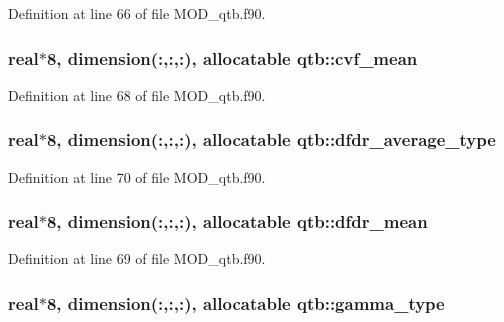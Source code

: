 Definition at line 66 of file M\-O\-D\-\_\-qtb.\-f90.

\hypertarget{classqtb_a46ac722f370f3b929e706228051801f4}{
\subsubsection[{cvf\-\_\-mean}]{\setlength{\rightskip}{0pt plus 5cm}real$\ast$8, dimension(\-:,\-:,\-:), allocatable qtb\-::cvf\-\_\-mean}}\label{classqtb_a46ac722f370f3b929e706228051801f4}


Definition at line 68 of file M\-O\-D\-\_\-qtb.\-f90.

\hypertarget{classqtb_a56c736b040cf072d7ec1e444bf685fb1}{
\subsubsection[{dfdr\-\_\-average\-\_\-type}]{\setlength{\rightskip}{0pt plus 5cm}real$\ast$8, dimension(\-:,\-:,\-:), allocatable qtb\-::dfdr\-\_\-average\-\_\-type}}\label{classqtb_a56c736b040cf072d7ec1e444bf685fb1}


Definition at line 70 of file M\-O\-D\-\_\-qtb.\-f90.

\hypertarget{classqtb_a4f973bc50caab8bd82ffbe4acb07dca9}{
\subsubsection[{dfdr\-\_\-mean}]{\setlength{\rightskip}{0pt plus 5cm}real$\ast$8, dimension(\-:,\-:,\-:), allocatable qtb\-::dfdr\-\_\-mean}}\label{classqtb_a4f973bc50caab8bd82ffbe4acb07dca9}


Definition at line 69 of file M\-O\-D\-\_\-qtb.\-f90.

\hypertarget{classqtb_a7cf4ab603940c782b2a24dfbbdedc7c1}{
\subsubsection[{gamma\-\_\-type}]{\setlength{\rightskip}{0pt plus 5cm}real$\ast$8, dimension(\-:,\-:,\-:), allocatable qtb\-::gamma\-\_\-type}}\label{classqtb_a7cf4ab603940c782b2a24dfbbdedc7c1}


